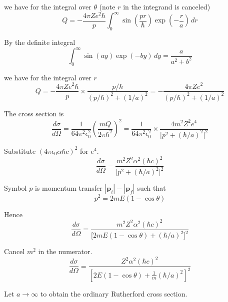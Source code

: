 we have for the integral over $\theta$ (note $r$ in the integrand is canceled)
\begin{equation*}
Q=-\frac{4\pi Ze^2\hbar}{p}
\int_0^\infty\sin\left(\frac{pr}{\hbar}\right)
\exp\left(-\frac{r}{a}\right)
\,dr
\end{equation*}

By the definite integral
\begin{equation*}
\int_0^\infty\sin(ay)\exp(-by)\,dy=\frac{a}{a^2+b^2}
\end{equation*}

we have for the integral over $r$
\begin{equation*}
Q=-\frac{4\pi Ze^2\hbar}{p}\times
\frac{p/\hbar}
{(p/\hbar)^2+(1/a)^2}
=-\frac{4\pi Ze^2}{(p/\hbar)^2+(1/a)^2}
\end{equation*}

The cross section is
\begin{equation*}
\frac{d\sigma}{d\Omega}
=\frac{1}{64\pi^2\epsilon_0^2}
\left(\frac{mQ}{2\pi\hbar^2}\right)^2
=\frac{1}{64\pi^2\epsilon_0^2}\times\frac{4m^2Z^2e^4}{\bigl[p^2+(\hbar/a)^2\bigr]^2}
\end{equation*}

Substitute $(4\pi\epsilon_0\alpha\hbar c)^2$ for $e^4$.
\begin{equation*}
\frac{d\sigma}{d\Omega}
=\frac{m^2Z^2\alpha^2(\hbar c)^2}{\bigl[p^2+(\hbar/a)^2\bigr]^2}
\end{equation*}

Symbol $p$ is momentum transfer $|\mathbf p_i|-|\mathbf p_f|$ such that
\begin{equation*}
p^2=2mE(1-\cos\theta)
\end{equation*}

Hence
\begin{equation*}
\frac{d\sigma}{d\Omega}
=\frac{m^2Z^2\alpha^2(\hbar c)^2}{\bigl[2mE(1-\cos\theta)+(\hbar/a)^2\bigr]^2}
\end{equation*}

Cancel $m^2$ in the numerator.
\begin{equation*}
\frac{d\sigma}{d\Omega}
=\frac{Z^2\alpha^2(\hbar c)^2}{\left[2E(1-\cos\theta)+\frac{1}{m}(\hbar/a)^2\right]^2}
\tag{1}
\end{equation*}

Let $a\rightarrow\infty$ to obtain the ordinary Rutherford cross section.



